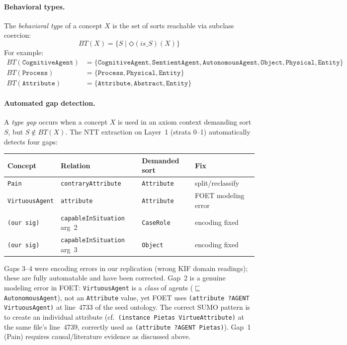 \documentclass[11pt]{article}
\newcommand{\DiamondOp}{\mathbin{\Diamond}}
\theoremstyle{definition}
\theoremstyle{plain}
\begin{document}
\paragraph{Behavioral types.}
The \emph{behavioral type} of a concept $X$ is the set of sorts
reachable via subclass coercion:
\[
  \mathit{BT}(X) = \{S \mid \DiamondOp(\mathit{is\_}S)(X)\}
\]
For example:
\begin{align*}
  \mathit{BT}(\texttt{CognitiveAgent}) &= \{\texttt{CognitiveAgent},
    \texttt{SentientAgent}, \texttt{AutonomousAgent}, \texttt{Object},
    \texttt{Physical}, \texttt{Entity}\} \\
  \mathit{BT}(\texttt{Process}) &= \{\texttt{Process},
    \texttt{Physical}, \texttt{Entity}\} \\
  \mathit{BT}(\texttt{Attribute}) &= \{\texttt{Attribute},
    \texttt{Abstract}, \texttt{Entity}\}
\end{align*}

\paragraph{Automated gap detection.}
A \emph{type gap} occurs when a concept $X$ is used in an axiom
context demanding sort $S$, but $S \notin \mathit{BT}(X)$.
The NTT extraction on Layer~1 (strata 0--1) automatically
detects four gaps:

\begin{center}
\small
\begin{tabular}{@{}llll@{}}
\toprule
\textbf{Concept} & \textbf{Relation} & \textbf{Demanded sort}
  & \textbf{Fix} \\
\midrule
\texttt{Pain} & \texttt{contraryAttribute} & \texttt{Attribute}
  & split/reclassify \\
\texttt{VirtuousAgent} & \texttt{attribute} & \texttt{Attribute}
  & FOET modeling error \\
\texttt{(our sig)} & \texttt{capableInSituation} arg~2 & \texttt{CaseRole}
  & encoding fixed \\
\texttt{(our sig)} & \texttt{capableInSituation} arg~3 & \texttt{Object}
  & encoding fixed \\
\bottomrule
\end{tabular}
\end{center}

Gaps 3--4 were encoding errors in our replication (wrong KIF domain
readings); these are fully automatable and have been corrected.
Gap~2 is a genuine modeling error in FOET: \texttt{VirtuousAgent} is
a \emph{class} of agents ($\sqsubseteq$ \texttt{AutonomousAgent}),
not an \texttt{Attribute} value, yet FOET uses
\texttt{(attribute ?AGENT VirtuousAgent)} at line~4733 of the seed
ontology.  The correct SUMO pattern is to create an individual
attribute (cf.\ \texttt{(instance Pietas VirtueAttribute)} at the
same file's line~4739, correctly used as
\texttt{(attribute ?AGENT Pietas)}).
Gap~1 (Pain) requires causal/literature evidence as discussed above.
\end{document}
